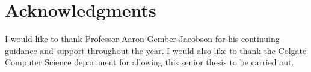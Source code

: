 \documentclass[../thesis.tex]{subfiles}
\begin{document}
\chapter*{Acknowledgments}
I would like to thank Professor Aaron Gember-Jacobson for his continuing guidance and support throughout the year. I would also like to thank the Colgate Computer Science department for allowing this senior thesis to be carried out.
\cleardoublepage
\end{document}
